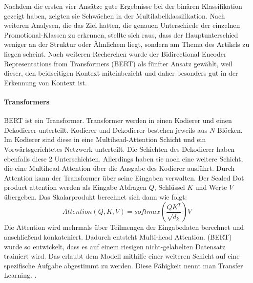 Nachdem die ersten vier Ansätze gute Ergebnisse bei der binären Klassifikation gezeigt haben, zeigten sie Schwächen in der Multilabelklassifikation. Nach weiteren Analysen, die das Ziel hatten, die genauen Unterschiede der einzelnen Promotional-Klassen zu erkennen, stellte sich raus, dass der Hauptunterschied weniger an der Struktur oder Ähnlichem liegt, sondern am Thema des Artikels zu liegen scheint. Nach weiteren Recherchen wurde der Bidirectional Encoder Representations from Transformers (BERT) als fünfter Ansatz gewählt, weil dieser, den beidseitigen Kontext miteinbezieht und daher besonders gut in der Erkennung von Kontext ist.
\paragraph{Transformers}
BERT ist ein Transformer. Transformer werden in einen Kodierer und einen Dekodierer unterteilt. Kodierer und Dekodierer bestehen jeweils aus $N$ Blöcken. Im Kodierer sind diese in eine Multihead-Attention Schicht und ein Vorwärtsgerichtetes Netzwerk unterteilt. Die Schichten des Dekodierer haben ebenfalls diese 2 Unterschichten. Allerdings haben sie noch eine weitere Schicht, die eine Multihead-Attention über die Ausgabe des Kodierer ausführt. Durch Attention kann der Transformer über seine Eingaben verwalten. Der Scaled Dot product attention werden als Eingabe Abfragen $Q$, Schlüssel $K$ und Werte $V$ übergeben. Das Skalarprodukt berechnet sich dann wie folgt:
$${Attention(Q,K,V)} = {softmax{(\frac{QK^T}{\sqrt{d_k}})} V}$$
Die Attention wird mehrmals über Teilmengen der Eingabedaten berechnet und anschließend konkateniert. Dadurch entsteht Multi-head Attention. \cite{Vaswani2017}
(BERT) wurde so entwickelt, dass es auf einem riesigen nicht-gelabelten Datensatz trainiert wird. Das erlaubt dem Modell mithilfe einer weiteren Schicht auf eine spezifische Aufgabe abgestimmt zu werden. Diese Fähigkeit nennt man Transfer Learning. %
\cite{Devlin2018}.

